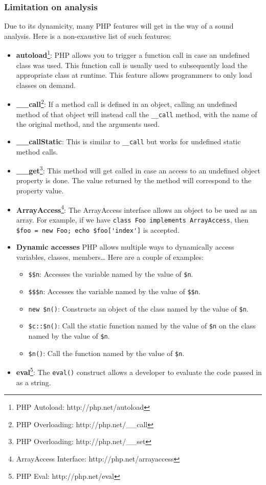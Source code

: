 \documentclass[a4paper]{article}
\begin{document}
\subsubsection{Limitation on analysis}
Due to its dynamicity, many PHP features will get in the way of a sound analysis.
Here is a non-exaustive list of such features:
\begin{itemize}
  \item \textbf{autoload}\footnote{PHP Autoload: http://php.net/autoload}:
    PHP allows you to trigger a function call in case an undefined class was
    used.  This function call is usually used to subsequently load the
    appropriate class at runtime. This feature allows programmers to only load
    classes on demand.
  \item \textbf{\_\_call}\footnote{PHP Overloading: http://php.net/\_\_call}:
    If a method call is defined in an object, calling an undefined method of
    that object will instead call the \verb&__call& method, with the name of
    the original method, and the arguments used.
  \item \textbf{\_\_callStatic}:
    This is similar to \verb&__call& but works for undefined static method
    calls.
  \item \textbf{\_\_get}\footnote{PHP Overloading: http://php.net/\_\_set}:
    This method will get called in case an access to an undefined object
    property is done. The value returned by the method will correspond to the
    property value.
  \item \textbf{ArrayAccess}\footnote{ArrayAccess Interface: http://php.net/arrayaccess}:
    The ArrayAccess interface allows an object to be used as an array. For example,
    if we have \verb&class Foo implements ArrayAccess&, then
    \verb&$foo = new Foo; echo $foo['index']& is accepted.
  \item \textbf{Dynamic accesses}
    PHP allows multiple ways to dynamically access variables, classes, members\ldots
    Here are a couple of examples:
    \begin{itemize}
      \item \verb/$$n/:
        Accesses the variable named by the value of \verb/$n/.
      \item \verb/$$$n/:
        Accesses the variable named by the value of \verb/$$n/.
      \item \verb/new $n()/:
        Constructs an object of the class named by the value of \verb/$n/.
      \item \verb/$c::$n()/:
        Call the static function named by the value of \verb/$n/ on the class
        named by the value of \verb/$n/.
      \item \verb/$n()/:
        Call the function named by the value of \verb/$n/.
    \end{itemize}
  \item \textbf{eval}\footnote{PHP Eval: http://php.net/eval}:
    The \verb&eval()& construct allows a developer to evaluate the code passed in as a string.
\end{itemize}
\end{document}
